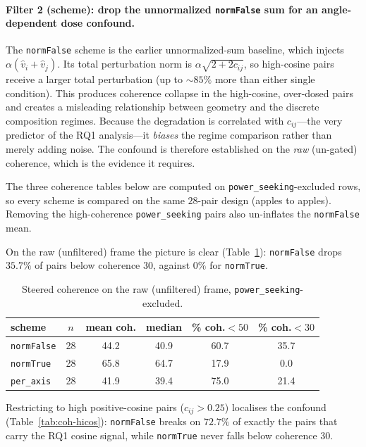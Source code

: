 \paragraph{Filter 2 (scheme): drop the unnormalized \texttt{normFalse} sum for
an angle-dependent dose confound.}
The \texttt{normFalse} scheme is the earlier unnormalized-sum baseline, which
injects $\alpha(\hat v_i+\hat v_j)$. Its total perturbation norm is
$\alpha\sqrt{2+2c_{ij}}$, so high-cosine pairs receive a larger total
perturbation (up to ${\sim}85\%$ more than either single condition). This
produces coherence collapse in the high-cosine, over-dosed pairs and creates a
misleading relationship between geometry and the discrete composition regimes.
Because the degradation is correlated with $c_{ij}$---the very predictor of the
RQ1 analysis---it \emph{biases} the regime comparison rather than merely adding
noise. The confound is therefore established on the \emph{raw} (un-gated)
coherence, which is the evidence it requires.

The three coherence tables below are computed on \texttt{power\_seeking}-excluded
rows, so every scheme is compared on the same $28$-pair design (apples to
apples). Removing the high-coherence \texttt{power\_seeking} pairs also
un-inflates the \texttt{normFalse} mean.

On the raw (unfiltered) frame the picture is clear
(Table~\ref{tab:coh-raw}): \texttt{normFalse} drops $35.7\%$ of pairs below
coherence $30$, against $0\%$ for \texttt{normTrue}.

\begin{table}[h]
  \centering
  \small
  \begin{tabular}{lccccc}
    \toprule
    scheme & $n$ & mean coh. & median & \% coh.${<}50$ & \% coh.${<}30$ \\
    \midrule
    \texttt{normFalse} & 28 & 44.2 & 40.9 & 60.7 & 35.7 \\
    \texttt{normTrue}  & 28 & 65.8 & 64.7 & 17.9 & 0.0  \\
    \texttt{per\_axis} & 28 & 41.9 & 39.4 & 75.0 & 21.4 \\
    \bottomrule
  \end{tabular}
  \caption{Steered coherence on the raw (unfiltered) frame,
  \texttt{power\_seeking}-excluded.}
  \label{tab:coh-raw}
\end{table}

Restricting to high positive-cosine pairs ($c_{ij}>0.25$) localises the confound
(Table~\ref{tab:coh-hicos}): \texttt{normFalse} breaks on $72.7\%$ of exactly
the pairs that carry the RQ1 cosine signal, while \texttt{normTrue} never falls
below coherence $30$.

